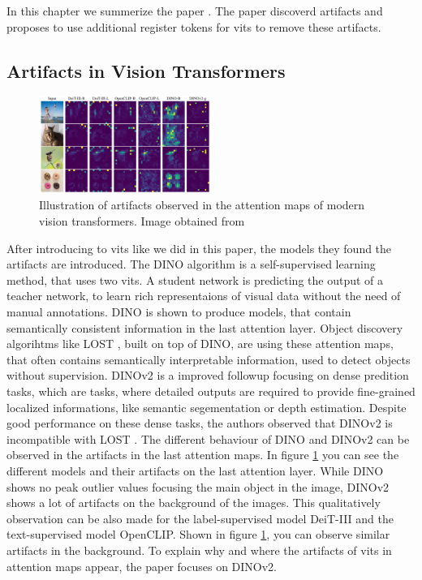 \documentclass[conference]{IEEEtran}
\begin{document}
  In this chapter we summerize the paper \cite{registers}. The paper discoverd artifacts and proposes to use additional register tokens for \acp{vit} to remove these artifacts.

  \subsection{Artifacts in Vision Transformers}
  \label{sec:registers:artifacts}

  \begin{figure}
    \centering
    \includegraphics[width=0.5\textwidth]{figures/vits-artifacts.png}
    \caption{Illustration of artifacts observed in the attention maps of modern vision transformers. Image obtained from \cite{registers}}
    \label{fig:artifacts-observations}
  \end{figure}


  After introducing to \acp{vit} like we did in this paper, the models they found the artifacts are introduced. The \mbox{DINO} algorithm is a self-supervised learning method, that uses two \acp{vit}. A student network is predicting the output of a teacher network, to learn rich representaions of visual data without the need of manual annotations. \cite{dino} \mbox{DINO} is shown to produce models, that contain semantically consistent information in the last attention layer. Object discovery algorihtms like \mbox{LOST} \cite{lost}, built on top of \mbox{DINO}, are using these attention maps, that often contains semantically interpretable information, used to detect objects without supervision. \mbox{DINOv2} \cite{dinov2} is a improved followup focusing on dense predition tasks, which are tasks, where detailed outputs are required to provide fine-grained localized informations, like semantic segementation or depth estimation. Despite good performance on these dense tasks, the authors observed that \mbox{DINOv2} is incompatible with \mbox{LOST} \cite{registers}. The different behaviour of \mbox{DINO} and \mbox{DINOv2} can be observed in the artifacts in the last attention maps. In figure \ref{fig:artifacts-observations} you can see the different models and their artifacts on the last attention layer.
  While \mbox{DINO} shows no peak outlier values focusing the main object in the image, \mbox{DINOv2} shows a lot of artifacts on the background of the images. This qualitatively observation can be also made for the label-supervised model \mbox{DeiT-III} and the text-supervised model \mbox{OpenCLIP}. Shown in figure \ref{fig:artifacts-observations}, you can observe similar artifacts in the background.
  To explain why and where the artifacts of \acp{vit} in attention maps appear, the paper focuses on \mbox{DINOv2}. 
\end{document}
